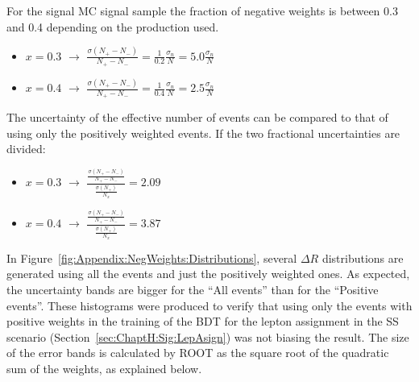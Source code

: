 For the signal \tHq \dileptau MC signal sample the fraction of negative weights is between 0.3 and 0.4 depending on the production used.
\begin{itemize}
	\item $x=0.3$	$\rightarrow$ $\frac{\sigma(N_{+} - N_{-})}{N_{+} - N_{-}}
	 = \frac{1}{0.2}\frac{\sigma_n}{N} = 5.0 \frac{\sigma_n}{N}$

	 \item $x=0.4$	$\rightarrow$ $\frac{\sigma(N_{+} - N_{-})}{N_{+} - N_{-}}
	 = \frac{1}{0.4}\frac{\sigma_n}{N} = 2.5 \frac{\sigma_n}{N}$
\end{itemize}

The uncertainty of the effective number of events can be compared to that of using only the 
positively weighted events. If the two fractional uncertainties are divided:


\begin{minipage}[t]{0.3\textwidth}
  \centering{}
\end{minipage}\hfill
\begin{minipage}[t]{0.7\textwidth}
\begin{flushleft}
\begin{itemize}
	\item $x=0.3$	$\rightarrow$ 
	$\frac{\frac{\sigma(N_{+} - N_{-})}{N_{+} - N_{-}}}{\frac{\sigma(N_+)}{N_x}}= 2.09$
	 \item $x=0.4$	$\rightarrow$ 
	$\frac{\frac{\sigma(N_{+} - N_{-})}{N_{+} - N_{-}}}{\frac{\sigma(N_+)}{N_x}}= 3.87$
\end{itemize}
\end{flushleft}
\end{minipage}




In Figure~\ref{fig:Appendix:NegWeights:Distributions}, several $\Delta R$ distributions are generated using all the events
and just the positively weighted ones. As expected, the uncertainty bands are bigger for the ``All events'' than for the
``Positive events''.  These histograms were produced to verify that using only the events with positive weights in
the training of the BDT for the lepton assignment in the SS scenario (Section~\ref{sec:ChaptH:Sig:LepAsign}) was not 
biasing the result. The size of the error bands is calculated by ROOT as the square root of the quadratic sum of the 
weights, as explained below.


